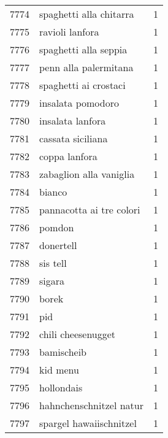\begin{tabular}{llr}
7774 &                            spaghetti alla chitarra &      1 \\
7775 &                                    ravioli lanfora &      1 \\
7776 &                              spaghetti alla seppia &      1 \\
7777 &                              penn alla palermitana &      1 \\
7778 &                              spaghetti ai crostaci &      1 \\
7779 &                                  insalata pomodoro &      1 \\
7780 &                                   insalata lanfora &      1 \\
7781 &                                  cassata siciliana &      1 \\
7782 &                                      coppa lanfora &      1 \\
7783 &                            zabaglion alla vaniglia &      1 \\
7784 &                                             bianco &      1 \\
7785 &                           pannacotta ai tre colori &      1 \\
7786 &                                             pomdon &      1 \\
7787 &                                          donertell &      1 \\
7788 &                                           sis tell &      1 \\
7789 &                                             sigara &      1 \\
7790 &                                              borek &      1 \\
7791 &                                                pid &      1 \\
7792 &                                 chili cheesenugget &      1 \\
7793 &                                         bamischeib &      1 \\
7794 &                                           kid menu &      1 \\
7795 &                                         hollondais &      1 \\
7796 &                            hahnchenschnitzel natur &      1 \\
7797 &                            spargel hawaiischnitzel &      1 \\

\end{tabular}
